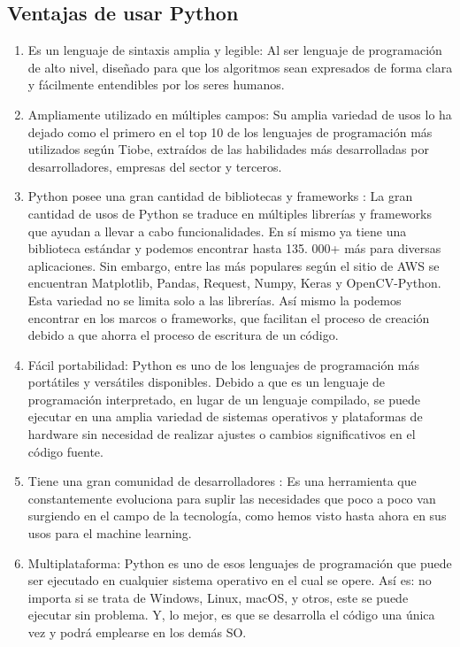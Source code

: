 \subsection{Ventajas de usar Python}
\begin{enumerate}
    \item Es un lenguaje de sintaxis amplia y legible: Al ser lenguaje de programación de alto nivel, diseñado para que los algoritmos sean expresados de forma clara y fácilmente entendibles por los seres humanos.
    \item Ampliamente utilizado en múltiples campos: Su amplia variedad de usos lo ha dejado como el primero en el top 10 de los lenguajes de programación más utilizados según Tiobe, extraídos de las habilidades más desarrolladas por desarrolladores, empresas del sector y terceros.
    \item Python posee una gran cantidad de bibliotecas y frameworks : La gran cantidad de usos de Python se traduce en múltiples librerías y frameworks que ayudan a llevar a cabo funcionalidades. En sí mismo ya tiene una biblioteca estándar y podemos encontrar hasta 135. 000+ más para diversas aplicaciones. Sin embargo, entre las más populares según el sitio de AWS se encuentran Matplotlib, Pandas, Request, Numpy, Keras y OpenCV-Python. Esta variedad no se limita solo a las librerías. Así mismo la podemos encontrar en los marcos o frameworks, que facilitan el proceso de creación debido a que ahorra el proceso de escritura de un código. 
    \item Fácil portabilidad: Python es uno de los lenguajes de programación más portátiles y versátiles disponibles. Debido a que es un lenguaje de programación interpretado, en lugar de un lenguaje compilado, se puede ejecutar en una amplia variedad de sistemas operativos y plataformas de hardware sin necesidad de realizar ajustes o cambios significativos en el código fuente.
    \item Tiene una gran comunidad de desarrolladores : Es una herramienta que constantemente evoluciona para suplir las necesidades que poco a poco van surgiendo en el campo de la tecnología, como hemos visto hasta ahora en sus usos para el machine learning.
    \item Multiplataforma: Python es uno de esos lenguajes de programación que puede ser ejecutado en cualquier sistema operativo en el cual se opere. Así es: no importa si se trata de Windows, Linux, macOS, y otros, este se puede ejecutar sin problema. Y, lo mejor, es que se desarrolla el código una única vez y podrá emplearse en los demás SO. 
\end{enumerate}
